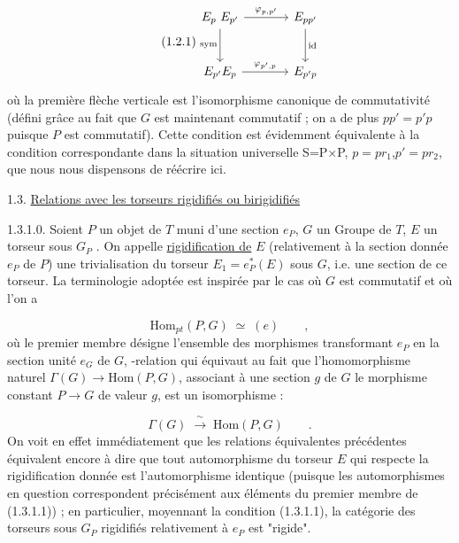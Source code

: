 \begin{equation}\tag{1.2.1}
\begin{tikzcd}[column sep=large, row sep=large]
E_p\ E_{p'} \arrow[r, "{\varphi_{p,p'}}"] \arrow[d, "\mathrm{sym}"'] & E_{pp'} \arrow[d, "\mathrm{id}"] \\
E_{p'}E_p \arrow[r, "{\varphi_{p',p}}"] & E_{p'p}
\end{tikzcd}
\end{equation}
où la première flèche verticale est l'isomorphisme canonique de commutativité (défini grâce au fait que $G$ est maintenant commutatif ; on a de plus $pp' = p'p$ puisque $P$ est commutatif). Cette condition est évidemment équivalente à la condition correspondante dans la situation universelle S=P$\times$P, $p=pr_1$,$p' = pr_2$, que nous nous dispensons de réécrire ici.


1.3.  \underline{Relations avec les torseurs rigidifiés ou birigidifiés}

1.3.1.0.  Soient $P$ un objet de $T$ muni d'une section $e_P$, $G$ un Groupe de \underline{$T$}, $E$ un torseur sous $G_P$ . On appelle \underline{rigidification de} $E$ (relativement à la section donnée $e_P$ de $P$) une trivialisation du torseur $E_1 = e_P^*(E)$ sous $G$,
i.e. une section de ce torseur. La terminologie adoptée est inspirée par le cas où $G$ est commutatif et où l'on a

\begin{equation}\tag{1.3.1.1}
\mathrm{Hom}_{pt}(P,G) \;\simeq\; (e) \qquad ,
\end{equation}
où le premier membre désigne l'ensemble des morphismes transformant $e_P$ en la section unité $e_G$ de $G$, -relation qui équivaut au fait que l'homomorphisme naturel $\Gamma(G) \longrightarrow \mathrm{Hom}(P,G)$, associant à une section $g$ de $G$ le morphisme constant $P \longrightarrow G$ de valeur $g$, est un isomorphisme :

\begin{equation}\tag{1.3.1.2}
\Gamma(G) \;\xrightarrow{\;\sim\;}\; \mathrm{Hom}(P,G) \qquad .
\end{equation}
On voit en effet immédiatement que les relations équivalentes précédentes équivalent encore à dire que tout automorphisme du torseur $E$ qui respecte la rigidification donnée est l'automorphisme identique (puisque les automorphismes en question correspondent précisément aux éléments du premier membre de (1.3.1.1)) ; en particulier, moyennant la condition (1.3.1.1), la catégorie des torseurs sous $G_P$ rigidifiés relativement à $e_P$ est "rigide".


